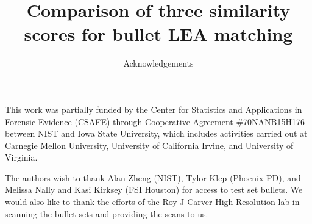 \documentclass{article}
\author{Acknowledgements}
\title{Comparison of three similarity scores for bullet LEA matching}
\date{}
\begin{document}
\maketitle

This work was partially funded by the Center for Statistics and Applications in Forensic Evidence (CSAFE) through Cooperative Agreement \#70NANB15H176 between NIST and Iowa State University, which includes activities carried out at Carnegie Mellon University, University of California Irvine, and University of Virginia.\vspace{1cm}

The authors wish to thank Alan Zheng (NIST), Tylor Klep (Phoenix PD), and Melissa Nally and Kasi Kirksey (FSI Houston) for access to test set bullets. We would also like to thank the efforts of the Roy J Carver High Resolution lab in scanning the bullet sets and providing the scans to us. 
\end{document}
